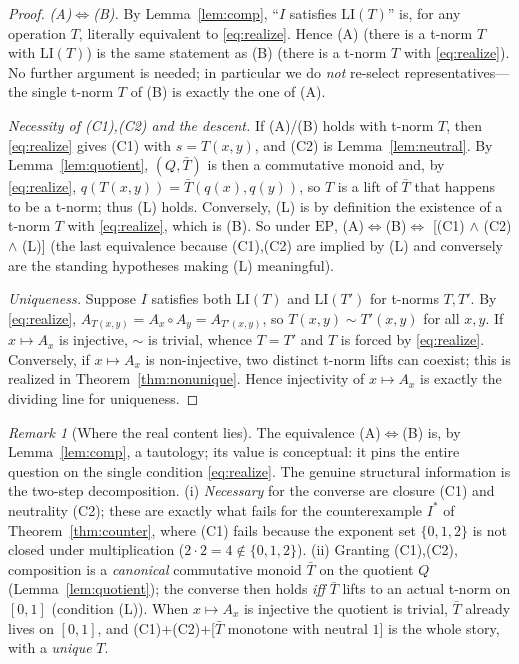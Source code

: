 \documentclass{amsart}
\theoremstyle{definition}
\theoremstyle{remark}
\newtheorem{remark}{Remark}
\newcommand{\zo}{[0,1]}
\newcommand{\LI}{\mathrm{LI}}
\newcommand{\EP}{\mathrm{EP}}
\newcommand{\Ax}{A}
\begin{document}
\begin{proof}
\emph{(A)$\Leftrightarrow$(B).} By Lemma~\ref{lem:comp}, ``$I$ satisfies $\LI(T)$'' is, for
any operation $T$, literally equivalent to \eqref{eq:realize}. Hence (A) (there is a t-norm
$T$ with $\LI(T)$) is the same statement as (B) (there is a t-norm $T$ with
\eqref{eq:realize}). No further argument is needed; in particular we do \emph{not} re-select
representatives---the single t-norm $T$ of (B) is exactly the one of (A).

\emph{Necessity of (C1),(C2) and the descent.} If (A)/(B) holds with t-norm $T$, then
\eqref{eq:realize} gives (C1) with $s=T(x,y)$, and (C2) is Lemma~\ref{lem:neutral}. By
Lemma~\ref{lem:quotient}, $(Q,\bar T)$ is then a commutative monoid and, by
\eqref{eq:realize}, $q(T(x,y))=\bar T(q(x),q(y))$, so $T$ is a lift of $\bar T$ that happens
to be a t-norm; thus (L) holds. Conversely, (L) is by definition the existence of a t-norm
$T$ with \eqref{eq:realize}, which is (B). So under $\EP$, (A)$\Leftrightarrow$(B)$\Leftrightarrow$
[(C1) $\wedge$ (C2) $\wedge$ (L)] (the last equivalence because (C1),(C2) are implied by
(L) and conversely are the standing hypotheses making (L) meaningful).

\emph{Uniqueness.} Suppose $I$ satisfies both $\LI(T)$ and $\LI(T')$ for t-norms $T,T'$. By
\eqref{eq:realize}, $\Ax_{T(x,y)}=\Ax_x\circ\Ax_y=\Ax_{T'(x,y)}$, so $T(x,y)\sim T'(x,y)$
for all $x,y$. If $x\mapsto\Ax_x$ is injective, $\sim$ is trivial, whence $T=T'$ and $T$ is
forced by \eqref{eq:realize}. Conversely, if $x\mapsto\Ax_x$ is non-injective, two distinct
t-norm lifts can coexist; this is realized in Theorem~\ref{thm:nonunique}. Hence injectivity
of $x\mapsto\Ax_x$ is exactly the dividing line for uniqueness.
\end{proof}

\begin{remark}[Where the real content lies]\label{rem:content}
The equivalence (A)$\Leftrightarrow$(B) is, by Lemma~\ref{lem:comp}, a tautology; its value
is conceptual: it pins the entire question on the single condition \eqref{eq:realize}. The
genuine structural information is the two-step decomposition. (i) \emph{Necessary} for the
converse are closure (C1) and neutrality (C2); these are exactly what fails for the
counterexample $I^{\ast}$ of Theorem~\ref{thm:counter}, where (C1) fails because the
exponent set $\{0,1,2\}$ is not closed under multiplication ($2\cdot2=4\notin\{0,1,2\}$).
(ii) Granting (C1),(C2), composition is a \emph{canonical} commutative monoid $\bar T$ on the
quotient $Q$ (Lemma~\ref{lem:quotient}); the converse then holds \emph{iff} $\bar T$ lifts
to an actual t-norm on $\zo$ (condition (L)). When $x\mapsto\Ax_x$ is injective the quotient
is trivial, $\bar T$ already lives on $\zo$, and (C1)+(C2)+[$\bar T$ monotone with neutral
$1$] is the whole story, with a \emph{unique} $T$.
\end{remark}
\end{document}
